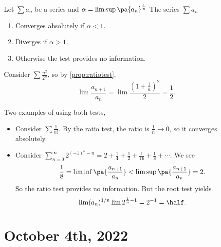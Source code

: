 \documentclass[11pt]{scrartcl}
\numberwithin{equation}{section}
\begin{document}
\begin{proposition}
    \label{prop:roottest}
    Let $\sum a_n$ be a series and $\alpha =\limsup \pa{a_n}^{\frac{1}{n}}$
    The series $\sum a_n$ 
    \begin{enumerate}
        \item Converges absolutely if $\alpha<1$.
        \item Diverges if $\alpha>1$.
        \item Otherwise the test provides no information.
    \end{enumerate}
\end{proposition}
\begin{example}
    Consider $\sum \frac{n^2}{2^n}$, so by \cref{prop:ratiotest},
    \[ \lim\frac{a_{n+1}}{a_n} = \lim\frac{\left(1+\frac{1}{n}\right)^2}{2} = \frac{1}{2}.\]
\end{example}

\begin{example}
    Two examples of using both tests,
    \begin{itemize}
        \item Consider $\sum\frac{1}{n!}$. 
        By the ratio test, the ratio is $\frac{1}{n} \rightarrow 0$, so it converges absolutely.
        \item Consider $\sum_{n=0}^{\infty}2^{(-1)^n-n} = 2 + \frac{1}{4}+\frac{1}{2}+\frac{1}{16}+ \frac{1}{8}+\cdots$.
        We see 
        \[ \frac{1}{8} = \liminf \pa{\frac{a_{n+1}}{a_n}} <  \limsup \pa{\frac{a_{n+1}}{a_n}}= 2.\]
        So the ratio test provides no information.
        But the root test yields
        \[\lim(a_n)^{1/n} \lim 2^{\frac{1}{n} - 1}= 2^{-1} = \half. \]
    \end{itemize}
\end{example}
\clearpage
\section{October 4th, 2022}
\end{document}
